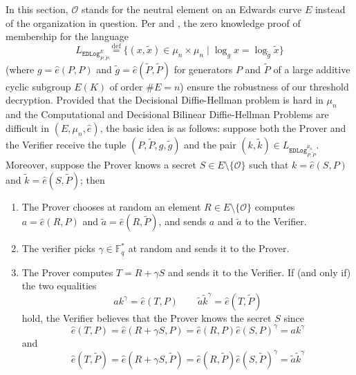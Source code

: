 
In this section, $\mathcal{O}$ stands for the neutral element on an Edwards
    curve $E$ instead of the organization in question.
Per \cite{baek2004identity} and \cite{li2006id}, the zero knowledge proof of
    membership for the language
\[
L_{\mathtt{EDLog}_{P, \widetilde{P}}^{E}}
    \stackrel{\mathrm{def}}{=}
    \{(x, \widetilde{x}) \in \mu_n \times \mu_n \mid \log_g x = \log_{
        \widetilde{g}}\widetilde{x} \}
\]
    (where $g = \widehat{e}(P, P)$ and $\widetilde{g} = \widehat{e}\left(
    \widetilde{P}, \widetilde{P}\right)$ for generators $P$ and $\widetilde{P}$
    of a large additive cyclic subgroup $E(K)$ of order $\#E = n$) ensure the
    robustness of our threshold decryption.
Provided that the Decisional Diffie-Hellman problem is hard in $\mu_n$ and the
Computational and Decisional Bilinear Diffie-Hellman Problems are difficult in
    $(E, \mu_n, \widehat{e})$, the basic idea is as follows: suppose both the
    Prover and the Verifier receive the tuple $\left(P, \widetilde{P}, g,
    \widetilde{g}\right)$ and the pair $(k, \widetilde{k}) \in
    L_{\mathtt{EDLog}_{P, \widetilde{P}}^{\mu_n}}$.
Moreover, suppose the Prover knows a secret $S \in E\setminus\{\mathcal{O}\}$
    such that $k = \widehat{e}(S, P)$ and $\widetilde{k} = \widehat{e}(S,
    \widetilde{P})$; then
\begin{enumerate}
\item The Prover chooses at random an element $R \in E\setminus\{\mathcal{O}\}$
    computes $a = \widehat{e}(R, P)$ and $\widetilde{a} = \widehat{e}(R,
    \widetilde{P})$, and sends $a$ and $\widetilde{a}$ to the Verifier.
\item The verifier picks $\gamma \in \mathbb{F}_q^\ast$ at random and sends it
    to the Prover.
\item The Prover computes $T = R + \gamma S$ and sends it to the Verifier.
    If (and only if) the two equalities
\[
ak^\gamma = \widehat{e}(T, P)
\qquad
\widetilde{a}\widetilde{k}^{\gamma} = \widehat{e}(T, \widetilde{P})
\]
    hold, the Verifier believes that the Prover knows the secret $S$ since
\[
\widehat{e}(T, P)
    = \widehat{e}(R + \gamma S, P)
    = \widehat{e}(R, P)\widehat{e}(S, P)^\gamma
    = ak^\gamma
\]
    and
\[
\widehat{e}(T, \widetilde{P})
    = \widehat{e}(R + \gamma S, \widetilde{P})
    = \widehat{e}(R, \widetilde{P})\widehat{e}(S, \widetilde{P})^\gamma
    = \widetilde{a}\widetilde{k}^\gamma
\]
\end{enumerate}

